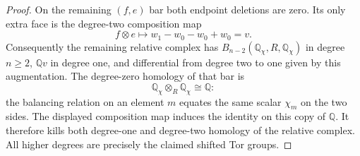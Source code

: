 \begin{proof}
On the remaining $(f,e)$ bar both endpoint deletions are
zero.  Its only extra face is the degree-two composition
map
\[
 f\otimes e\longmapsto
 w_1-w_0-w_0+w_0=v.
\]
Consequently the remaining relative complex has
$B_{n-2}(\mathbb Q_\chi,R,\mathbb Q_\chi)$ in degree
$n\geq2$, $\mathbb Qv$ in degree one, and differential
from degree two to one given by this augmentation.
The degree-zero homology of that bar is
\[
 \mathbb Q_\chi\otimes_R\mathbb Q_\chi\cong\mathbb Q:
\]
the balancing relation on an element $m$ equates the
same scalar $\chi_m$ on the two sides.  The displayed
composition map induces the identity on this copy of
$\mathbb Q$.  It therefore kills both degree-one and
degree-two homology of the relative complex.  All higher
degrees are precisely the claimed shifted Tor groups.
\end{proof}

